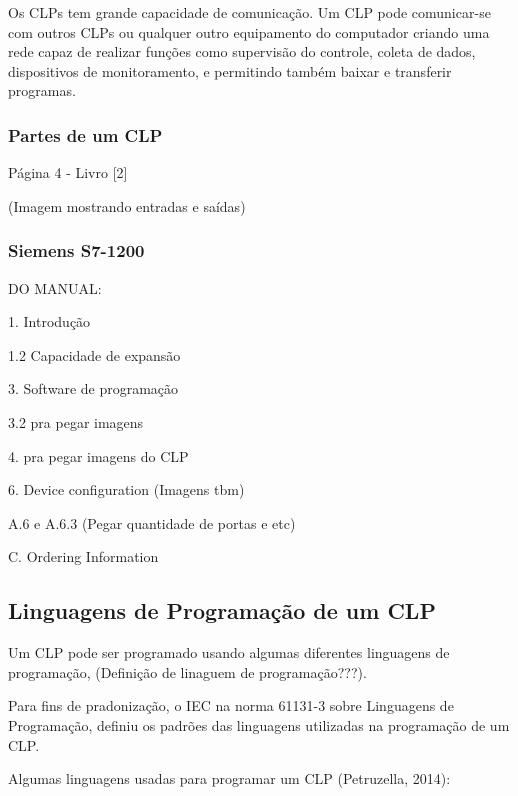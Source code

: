 \documentclass[a4paper, 12pt]{article}
\begin{document}
		Os CLPs tem grande capacidade de comunicação. Um CLP pode comunicar-se com outros CLPs ou qualquer outro
		equipamento do computador criando uma rede capaz de realizar funções como supervisão do controle, coleta de dados,
		dispositivos de monitoramento, e permitindo também baixar e transferir programas.
	
		\subsubsection{Partes de um CLP}
			Página 4 - Livro [2]
		
			(Imagem mostrando entradas e saídas)
	
		\subsubsection{Siemens S7-1200}
		
			DO MANUAL:
		
			1. Introdução
		
			1.2 Capacidade de expansão
		
			3. Software de programação
		
			3.2 pra pegar imagens
		
			4. pra pegar imagens do CLP
		
			6. Device configuration (Imagens tbm)
		
			A.6 e A.6.3 (Pegar quantidade de portas e etc)
		
			C. Ordering Information

	\subsection{Linguagens de Programação de um CLP}
	
		Um CLP pode ser programado usando algumas diferentes linguagens de programação, (Definição de linaguem de programação???).
		
		Para fins de pradonização, o IEC na norma 61131-3 sobre Linguagens de Programação,
		definiu os padrões das linguagens utilizadas na programação de um CLP.

		Algumas linguagens usadas para programar um CLP (Petruzella, 2014):
		
\end{document}
